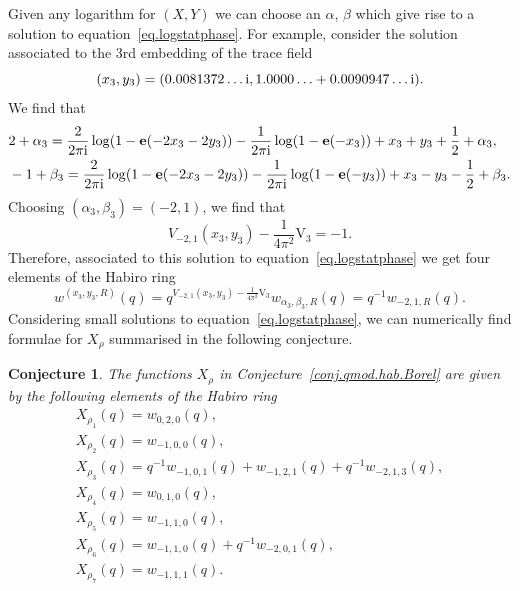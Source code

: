 \documentclass[pdftex]{sigma}
\numberwithin{equation}{section}
\newtheorem{Conjecture}[Theorem]{Conjecture}
\def\e{\mathbf e}
\def\VC{\mathrm{VC}}
\def\VC{\mathrm{V}}
\begin{document}
Given any logarithm for $(X,Y)$ we can choose an $\alpha$, $\beta$ which give rise to a solution to equation~\eqref{eq.logstatphase}. For example, consider the solution associated to the 3rd embedding of the trace field
\[
 (x_3,y_3) =(0.0081372\dots {\rm i}, 1.0000\ldots + 0.0090947\dots {\rm i}) .
\]
We find that
\begin{align*}
& 2+\alpha_3 =\frac{2}{2\pi {\rm i}}\log(1-\e(-2x_3-2y_3))-\frac{1}{2\pi {\rm i}}\log(1-\e(-x_3))+x_3+y_3+\frac{1}{2}+\alpha_3,\\
& -1+\beta_3 =\frac{2}{2\pi {\rm i}}\log(1-\e(-2x_3-2y_3))-\frac{1}{2\pi {\rm i}}\log(1-\e(-y_3))+x_3-y_3-\frac{1}{2}+\beta_3 .
\end{align*}
Choosing $(\alpha_3,\beta_3)=(-2,1)$, we find that
\[
 V_{-2,1}(x_3,y_3)-\frac{1}{4\pi^2}\VC_3 =-1 .
\]
Therefore, associated to this solution to equation~\eqref{eq.logstatphase} we get four elements of the Habiro ring
\[
 w^{(x_3,y_3,R)}(q)
  =
 q^{V_{-2,1}(x_3,y_3)-\frac{1}{4\pi^2}\VC_3}w_{\alpha_3,\beta_3,R}(q)
  =
 q^{-1}w_{-2,1,R}(q) .
\]
Considering small solutions to equation~\eqref{eq.logstatphase}, we can numerically find formulae for $X_{\rho}$ summarised in the following conjecture.

\begin{Conjecture}
The functions $X_{\rho}$ in Conjecture~{\rm \ref{conj.qmod.hab.Borel}} are given by the following elements of the Habiro ring
\begin{gather}
 X_{\rho_1}(q)  =w_{0,2,0}(q) ,\nonumber\\
 X_{\rho_2}(q)  =w_{-1,0,0}(q) ,\nonumber\\
 X_{\rho_3}(q)  =q^{-1}w_{-1,0,1}(q)+w_{-1,2,1}(q)+q^{-1}w_{-2,1,3}(q) ,\nonumber\\
 X_{\rho_4}(q)  =w_{0,1,0}(q) ,\nonumber\\
 X_{\rho_5}(q)  =w_{-1,1,0}(q) ,\nonumber\\
 X_{\rho_6}(q)  =w_{-1,1,0}(q)+q^{-1}w_{-2,0,1}(q) ,\nonumber\\
 X_{\rho_7}(q)  =w_{-1,1,1}(q) .\label{eq:can.basis}
\end{gather}
\end{Conjecture}
\end{document}
